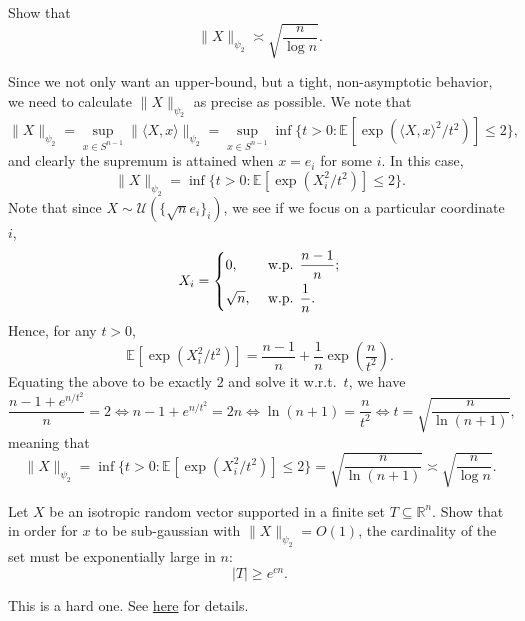 \begin{problem*}[Exercise 3.4.4]\label{ex3.4.4}
	Show that
	\[
		\lVert X \rVert _{\psi _2}
		\asymp \sqrt{\frac{n}{\log n}} .
	\]
\end{problem*}
\begin{answer}
	Since we not only want an upper-bound, but a tight, non-asymptotic behavior, we need to calculate \(\lVert X \rVert _{\psi _2}\) as precise as possible. We note that
	\[
		\lVert X \rVert _{\psi _2}
		= \sup _{x \in S^{n-1}} \lVert \langle X, x \rangle \rVert _{\psi _2}
		= \sup _{x \in S^{n-1}} \inf \{ t > 0 \colon \mathbb{E}_{}[\exp (\langle X, x \rangle ^2 / t^2)] \leq 2 \},
	\]
	and clearly the supremum is attained when \(x = e_i\) for some \(i\). In this case,
	\[
		\lVert X \rVert _{\psi _2}
		= \inf \{ t > 0 \colon \mathbb{E}_{}[\exp (X_i^2 / t^2)] \leq 2 \}.
	\]
	Note that since \(X \sim \mathcal{U} (\{ \sqrt{n} e_i \} _i)\), we see if we focus on a particular coordinate \(i\),
	\[
		X_i = \begin{dcases}
			0,         & \text{ w.p. } \frac{n-1}{n} ; \\
			\sqrt{n} , & \text{ w.p. } \frac{1}{n} .
		\end{dcases}
	\]
	Hence, for any \(t > 0\),
	\[
		\mathbb{E}_{}[\exp (X_i^2 / t^2)]
		= \frac{n-1}{n} + \frac{1}{n} \exp (\frac{n}{t^2}).
	\]
	Equating the above to be exactly \(2\) and solve it w.r.t.\ \(t\), we have
	\[
		\frac{n-1 + e^{n / t^2}}{n} = 2
		\iff n-1 + e^{n / t^2} = 2n
		\iff \ln (n + 1) = \frac{n}{t^2}
		\iff t = \sqrt{\frac{n}{\ln (n+1)}},
	\]
	meaning that
	\[
		\lVert X \rVert _{\psi _2}
		= \inf \{ t > 0 \colon \mathbb{E}_{}[\exp (X_i^2 / t^2)] \leq 2 \}
		= \sqrt{\frac{n}{\ln (n+1)}}
		\asymp \sqrt{\frac{n}{\log n}}.
	\]
\end{answer}

\begin{problem*}[Exercise 3.4.5]\label{ex3.4.5}
	Let \(X\) be an isotropic random vector supported in a finite set \(T \subseteq \mathbb{R} ^n\). Show that in order for \(x\) to be sub-gaussian with \(\lVert X \rVert _{\psi _2} = O(1)\), the cardinality of the set must be exponentially large in \(n\):
	\[
		\lvert T \rvert
		\geq e^{cn}.
	\]
\end{problem*}
\begin{answer}
	This is a hard one. See \href{https://mathoverflow.net/a/326050/525170}{here} for details.
\end{answer}

